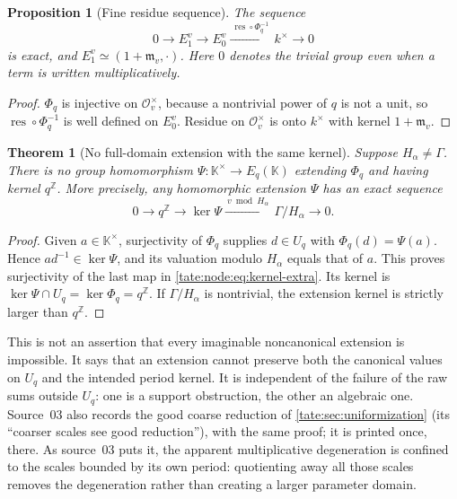 \documentclass[11pt,letterpaper]{article}
\newtheorem{theorem}{Theorem}[section]
\newtheorem{proposition}[proposition]{Proposition}
\theoremstyle{definition}
\newcommand{\Z}{\mathbb Z}
\newcommand{\res}{\operatorname{res}}
\newcommand{\m}{\mathfrak m}
\newcommand{\OO}{\mathcal O}
\newcommand{\KK}{\mathbb K}
\begin{document}
\begin{proposition}[Fine residue sequence]\label{tate:node:prop:residue}
The sequence
\begin{equation}
 0\longrightarrow E^v_1\longrightarrow E^v_0
 \xrightarrow{\ \res\circ\Phi_q^{-1}\ }k^\times\longrightarrow0
 \label{tate:node:eq:residueexact}
\end{equation}
is exact, and $E^v_1\simeq(1+\m_v,\cdot)$. Here $0$ denotes the trivial
group even when a term is written multiplicatively.
\end{proposition}

\begin{proof}
$\Phi_q$ is injective on $\OO_v^\times$, because a nontrivial power of $q$
is not a unit, so $\res\circ\Phi_q^{-1}$ is well defined on $E^v_0$.
Residue on $\OO_v^\times$ is onto $k^\times$ with kernel $1+\m_v$.
\end{proof}

\begin{theorem}[No full-domain extension with the same kernel]\label{tate:node:thm:obstruction}
Suppose $H_\alpha\ne\Gamma$. There is no group homomorphism
$\Psi:\KK^\times\to E_q(\KK)$ extending $\Phi_q$ and having kernel
$q^\Z$. More precisely, any homomorphic extension $\Psi$ has an exact
sequence
\begin{equation}
 0\longrightarrow q^\Z\longrightarrow\ker\Psi
   \xrightarrow{\ v\bmod H_\alpha\ }\Gamma/H_\alpha
   \longrightarrow0.\label{tate:node:eq:kernel-extra}
\end{equation}
\end{theorem}

\begin{proof}
Given $a\in\KK^\times$, surjectivity of $\Phi_q$ supplies $d\in U_q$ with
$\Phi_q(d)=\Psi(a)$. Hence $ad^{-1}\in\ker\Psi$, and its valuation modulo
$H_\alpha$ equals that of $a$. This proves surjectivity of the last map in
\eqref{tate:node:eq:kernel-extra}. Its kernel is
$\ker\Psi\cap U_q=\ker\Phi_q=q^\Z$. If $\Gamma/H_\alpha$ is nontrivial,
the extension kernel is strictly larger than $q^\Z$.
\end{proof}

This is not an assertion that every imaginable noncanonical extension is
impossible. It says that an extension cannot preserve both the canonical
values on $U_q$ and the intended period kernel. It is independent of the
failure of the raw sums outside $U_q$: one is a support obstruction, the
other an algebraic one. Source~03 also records the good coarse reduction of
\cref{tate:sec:uniformization} (its ``coarser scales see good reduction''),
with the same proof; it is printed once, there. As source~03 puts it, the
apparent multiplicative degeneration is confined to the scales bounded by
its own period: quotienting away all those scales removes the degeneration
rather than creating a larger parameter domain.
\end{document}
